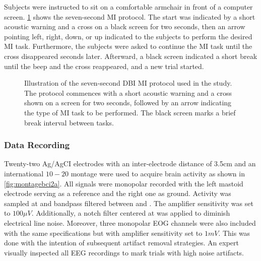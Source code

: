 Subjects were instructed to sit on a comfortable armchair in front of a computer screen. \cref{fig:BCI2aprotocol} shows the seven-second MI protocol. The start was indicated by a short acoustic warning and a cross on a black screen for two seconds, then an arrow pointing left, right, down, or up indicated to the subjects to perform the desired MI task. Furthermore, the subjects were asked to continue the MI task until the cross disappeared  seconds later. Afterward, a black screen indicated a short break until the beep and the cross reappeared, and a new trial started.

\begin{figure}[h!]
\centering
    \resizebox{0.5\linewidth}{!}{}
    \caption{Illustration of the seven-second DBI MI protocol used in the study. The protocol commences with a short acoustic warning and a cross shown on a screen for two seconds, followed by an arrow indicating the type of MI task to be performed. The black screen marks a brief break interval between tasks.
    \label{fig:BCI2aprotocol}}
\end{figure}

\subsubsection{Data Recording}

Twenty-two Ag/AgCI electrodes with an inter-electrode distance of 3.5cm and an international $10-20$ montage were used to acquire brain activity as shown in \cref{fig:montagebci2a}. All signals were monopolar recorded with the left mastoid electrode serving as a reference and the right one as ground. Activity was sampled at  and bandpass filtered between  and . The amplifier sensitivity was set to $100 \mu V$. Additionally, a notch filter centered at  was applied to diminish electrical line noise. Moreover, three monopolar EOG channels were also included with the same specifications but with amplifier sensitivity set to $1mV$. This was done with the intention of subsequent artifact removal strategies. An expert visually inspected all EEG recordings to mark trials with high noise artifacts.

